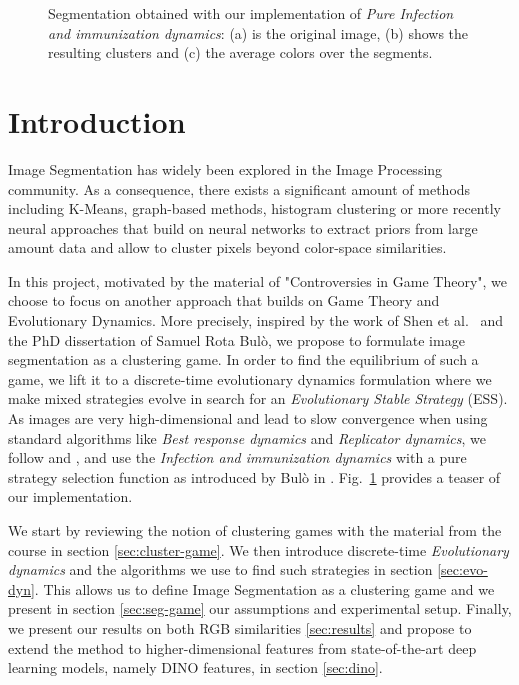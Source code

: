 \documentclass[11pt,a4paper]{article}
\begin{document}
\begin{figure}[H]
\begin{subfigure}[b]{0.3\textwidth}
        \caption{ }
    \end{subfigure}
       \caption{Segmentation obtained with our implementation of \textit{Pure Infection and immunization dynamics}: (a) is the original image, (b) shows the resulting clusters and (c) the average colors over the segments.}
       \label{fig:teaser}
\end{figure}

\section{Introduction}

Image Segmentation has widely been explored in the Image Processing community. As a consequence, there exists a significant amount of methods including K-Means, graph-based methods\cite{graph-segmentation}, histogram clustering\cite{histogram-clustering} or more recently neural approaches that build on neural networks to extract priors from large amount data\cite{panoptic-segmentation} and allow to cluster pixels beyond color-space similarities.

In this project, motivated by the material of "Controversies in Game Theory"\cite{course-gt}, we choose to focus on another approach that builds on Game Theory and Evolutionary Dynamics. More precisely, inspired by the work of Shen et al.~\cite{game-clustering} and the PhD dissertation of Samuel Rota Bulò\cite{bulo-thesis}, we propose to formulate image segmentation as a clustering game. In order to find the equilibrium of such a game, we lift it to a discrete-time evolutionary dynamics formulation where we make mixed strategies evolve in search for an \textit{Evolutionary Stable Strategy} (ESS). As images are very high-dimensional and lead to slow convergence when using standard algorithms like \textit{Best response dynamics} and \textit{Replicator dynamics}, we follow \cite{game-clustering} and \cite{bulo-thesis}, and use the \textit{Infection and immunization dynamics} with a pure strategy selection function as introduced by Bulò in \cite{inimdyn}. Fig.~\ref{fig:teaser} provides a teaser of our implementation.

We start by reviewing the notion of clustering games with the material from the course\cite{course-gt} in section \ref{sec:cluster-game}. We then introduce discrete-time \textit{Evolutionary dynamics} and the algorithms we use to find such strategies in section \ref{sec:evo-dyn}. This allows us to define Image Segmentation as a clustering game and we present in section \ref{sec:seg-game} our assumptions and experimental setup. Finally, we present our results on both RGB similarities \ref{sec:results} and propose to extend the method to higher-dimensional features from state-of-the-art deep learning models, namely DINO features\cite{dino}, in section \ref{sec:dino}.
\end{document}
